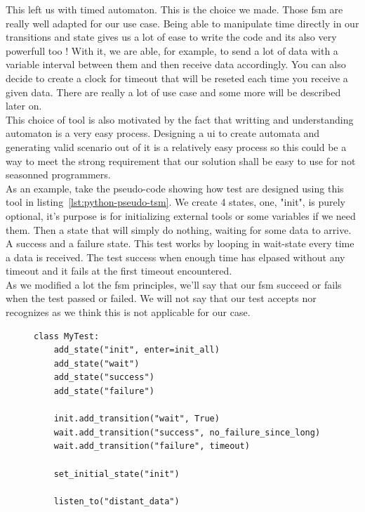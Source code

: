 \documentclass[12pt]{article}
\begin{document}
This left us with timed automaton. This is the choice we made. Those \gls{fsm} are really well adapted for our use case. Being able to manipulate time directly in our transitions and state gives us a lot of ease to write the code and its also very powerfull too ! With it, we are able, for example, to send a lot of data with a variable interval between them and then receive data accordingly. You can also decide to create a clock for timeout that will be reseted each time you receive a given data. There are really a lot of use case and some more will be described later on.\\

This choice of tool is also motivated by the fact that writting and understanding automaton is a very easy process. Designing a \gls{ui} to create automata and generating valid scenario out of it is a relatively easy process so this could be a way to meet the strong requirement that our solution shall be easy to use for not seasonned programmers.\\

As an example, take the pseudo-code showing how test are designed using this tool in listing~\ref{lst:python-pseudo-tsm}. We create 4 states, one, "init", is purely optional, it's purpose is for initializing external tools or some variables if we need them. Then a state that will simply do nothing, waiting for some data to arrive. A success and a failure state. This test works by looping in wait-state every time a data is received. The test success when enough time has elpased without any timeout and it fails at the first timeout encountered.\\

As we modified a lot the \gls{fsm} principles, we'll say that our \gls{fsm} succeed or fails when the test passed or failed. We will not say that our test accepts nor recognizes as we think this is not applicable for our case.\\

\begin{figure}
    \label{python-pseudo-tsm}
    \begin{lstlisting}[frame=single,caption="Pseudo test case example",label={lst:python-pseudo-tsm}]
class MyTest:
    add_state("init", enter=init_all)
    add_state("wait")
    add_state("success")
    add_state("failure")

    init.add_transition("wait", True)
    wait.add_transition("success", no_failure_since_long)
    wait.add_transition("failure", timeout)

    set_initial_state("init")

    listen_to("distant_data")
    \end{lstlisting}
\end{figure}
\end{document}

